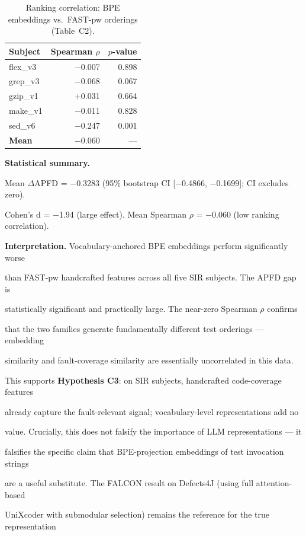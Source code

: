 \documentclass[conference]{IEEEtran}
\begin{document}
\begin{table}[t]
\caption{Ranking correlation: BPE embeddings vs.\ FAST-pw orderings (Table~C2).}
\centering
\begin{tabular}{lrr}
\toprule
\textbf{Subject} & \textbf{Spearman $\rho$} & \textbf{$p$-value} \\
\midrule
flex\_v3 & $-$0.007 & 0.898 \\
grep\_v3 & $-$0.068 & 0.067 \\
gzip\_v1 & $+$0.031 & 0.664 \\
make\_v1 & $-$0.011 & 0.828 \\
sed\_v6 & $-$0.247 & 0.001 \\
\midrule
\textbf{Mean} & $\mathbf{-0.060}$ & --- \\
\bottomrule
\end{tabular}
\end{table}


\textbf{Statistical summary.}

Mean $\Delta$APFD = $-$0.3283 (95\% bootstrap CI [$-$0.4866, $-$0.1699]; CI excludes zero).

Cohen's d = $-$1.94 (large effect).  Mean Spearman $\rho$ = $-$0.060 (low ranking correlation).


\textbf{Interpretation.}  Vocabulary-anchored BPE embeddings perform significantly worse

than FAST-pw handcrafted features across all five SIR subjects.  The APFD gap is

statistically significant and practically large.  The near-zero Spearman $\rho$ confirms

that the two families generate fundamentally different test orderings — embedding

similarity and fault-coverage similarity are essentially uncorrelated in this data.


This supports \textbf{Hypothesis C3}: on SIR subjects, handcrafted code-coverage features

already capture the fault-relevant signal; vocabulary-level representations add no

value.  Crucially, this does not falsify the importance of LLM representations — it

falsifies the specific claim that BPE-projection embeddings of test invocation strings

are a useful substitute.  The FALCON result on Defects4J (using full attention-based

UniXcoder with submodular selection) remains the reference for the true representation
\end{document}
